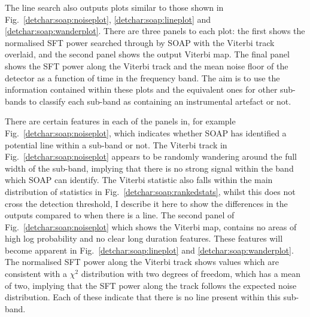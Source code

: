 %
The line search also outputs
plots similar to those shown in Fig.~\ref{detchar:soap:noiseplot},
\ref{detchar:soap:lineplot} and \ref{detchar:soap:wanderplot}.  There are three
panels to each plot: the first shows the normalised \gls{SFT} power searched
through by SOAP with the Viterbi track overlaid, and the second panel shows the
output Viterbi map.  The final panel shows the \gls{SFT} power along the
Viterbi track and the mean noise floor of the detector as a function of time in
the frequency band.  The aim is to use the information contained within these
plots and the equivalent ones for other sub-bands to classify each sub-band as
containing an instrumental artefact or not. 

%
There are certain features in each of the panels in, for example
Fig.~\ref{detchar:soap:noiseplot}, which indicates whether SOAP has identified
a potential line within a sub-band or not.  The Viterbi track in
Fig.~\ref{detchar:soap:noiseplot} appears to be randomly wandering around the
full width of the sub-band, implying that there is no strong signal within the
band which SOAP can identify.  The Viterbi statistic also falls within the main
distribution of statistics in Fig.~\ref{detchar:soap:rankedstats}, whilst this
does not cross the detection threshold, I
describe it here to show the differences in the outputs compared to when there
is a line.  The second panel of Fig.~\ref{detchar:soap:noiseplot} which shows
the Viterbi map, contains no areas of high log probability and no clear long
duration features. These features will become apparent in
Fig.~\ref{detchar:soap:lineplot} and \ref{detchar:soap:wanderplot}.  The
normalised \gls{SFT} power along the Viterbi track shows values which are
consistent with a $\chi^2$ distribution with two degrees of freedom, which has
a mean of two, implying that the \gls{SFT} power along the track follows the
expected noise distribution.  Each of these indicate that there is no line
present within this sub-band.
%
